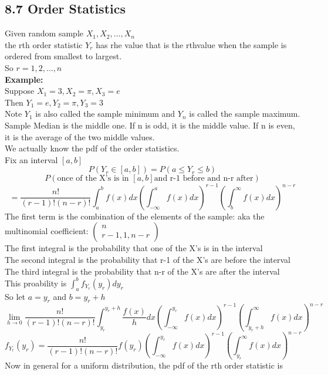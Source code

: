 \documentclass{article}
\begin{document}
\subsection{8.7 Order Statistics}
Given random sample $X_1, X_2, \ldots, X_n$\\
the rth order statistic $Y_r$ has rhe value that is the rthvalue when the sample is ordered from smallest to largest.\\
So $r = 1, 2, \ldots, n$\\
\textbf{Example:} \\
Suppose $X_1 = 3, X_2 = \pi, X_3 = e$\\
Then $Y_1 = e, Y_2 = \pi, Y_3 = 3$\\
Note $Y_1$ is also called the sample minimum and $Y_n$ is called the sample maximum.\\
Sample Median is the middle one. If n is odd, it is the middle value. If n is even, it is the average of the two middle values.\\
We actually know the pdf of the order statistics.\\
Fix an interval $[a,b]$\\
$$P(Y_r \in [a,b]) = P(a \leq Y_r \leq b)$$
$$P(\text{once of the X's is in } [a,b] \text{and r-1 before and n-r after})$$
$$ = \frac{n!}{(r-1)!(n-r)!}\int_{a}^{b} f(x) dx (\int_{-\infty}^{a} f(x) dx)^{r-1} (\int_{b}^{\infty} f(x) dx)^{n-r}$$
The first term is the combination of the elements of the sample: aka the multinomial coefficient: $\begin{pmatrix}
    n\\
    r-1, 1, n-r
\end{pmatrix}$\\
The first integral is the probability that one of the X's is in the interval\\
The second integral is the probability that r-1 of the X's are before the interval\\
The third integral is the probability that n-r of the X's are after the interval\\
This proability is $\int_a^b f_{Y_r}(y_r) dy_r$\\
So let $a = y_r$ and $b = y_r + h$\\
$$\lim_{h \rightarrow 0} \frac{n!}{(r-1)!(n-r)!} \int_{y_r}^{y_r + h} \frac{f(x)}{h} dx (\int_{-\infty}^{y_r} f(x) dx)^{r-1} (\int_{y_r + h}^{\infty} f(x) dx)^{n-r}$$
$$ f_{Y_r}(y_r) = \frac{n!}{(r-1)!(n-r)!} f(y_r) (\int_{-\infty}^{y_r} f(x) dx)^{r-1} (\int_{y_r}^{\infty} f(x) dx)^{n-r}$$
Now in general for a uniform distribution, the pdf of the rth order statistic is
\end{document}
